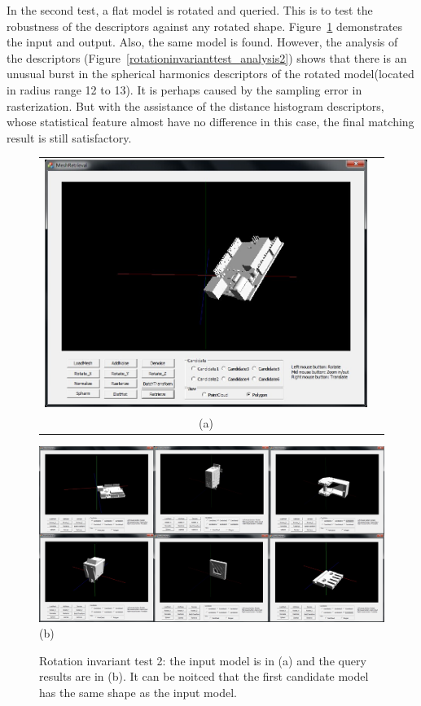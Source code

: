 \begin{enumerate}
In the second test, a flat model is rotated and queried. This is to test the robustness of the descriptors against any rotated shape. Figure~\ref{noiseinvarianttest_UI2} demonstrates the input and output. Also, the same model is found. However, the analysis of the descriptors (Figure~\ref{rotationinvarianttest_analysis2}) shows that there is an unusual burst in the spherical harmonics descriptors of the rotated model(located in radius range 12 to 13). It is perhaps caused by the sampling error in rasterization. But with the assistance of the distance histogram descriptors, whose statistical feature almost have no difference in this case, the final matching result is still satisfactory. 

\begin{figure}
\begin{center}
\begin{tabular}{cc}   %
   \includegraphics[width=0.6\linewidth]{input_rotationinvariant_test32}  \\
   (a) \\
\end{tabular}
   \includegraphics[width=1\linewidth]{output_rotationinvariant_test32}  \\
   (b)  \\
\caption{Rotation invariant test 2: the input model is in (a) and the query results are in (b). It can be noitced that the first candidate model has the same shape as the input model.} 
  \label{noiseinvarianttest_UI2}
\end{center}
\end{figure}


\end{enumerate}

